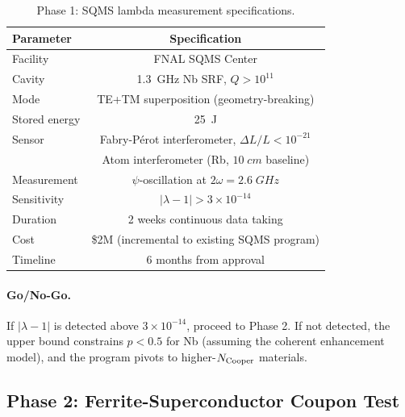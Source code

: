 \documentclass[twocolumn,prl,superscriptaddress,nofootinbib,longbibliography,floatfix]{revtex4-2}
\begin{document}
\begin{table}[h]
\centering
\caption{Phase 1: SQMS lambda measurement specifications.}
\label{tab:phase1}
\begin{ruledtabular}
\begin{tabular}{lc}
Parameter & Specification \\
\hline
Facility & FNAL SQMS Center \\
Cavity & 1.3~GHz Nb SRF, $Q > 10^{11}$ \\
Mode & TE+TM superposition (geometry-breaking) \\
Stored energy & 25~J \\
Sensor & Fabry-P\'{e}rot interferometer, $\Delta L/L < 10^{-21}$ \\
 & Atom interferometer (Rb, $10\;\si{cm}$ baseline) \\
Measurement & $\psi$-oscillation at $2\omega = 2.6\;\si{GHz}$ \\
Sensitivity & $|\lambda - 1| > 3 \times 10^{-14}$ \\
Duration & 2 weeks continuous data taking \\
Cost & \$2M (incremental to existing SQMS program) \\
Timeline & 6 months from approval \\
\end{tabular}
\end{ruledtabular}
\end{table}

\paragraph{Go/No-Go.} If $|\lambda - 1|$ is detected above
$3 \times 10^{-14}$, proceed to Phase 2.  If not detected, the upper
bound constrains $p < 0.5$ for Nb (assuming the coherent enhancement
model), and the program pivots to higher-$N_{\rm Cooper}$ materials.

\subsection{Phase 2: Ferrite-Superconductor Coupon Test}
\end{document}
